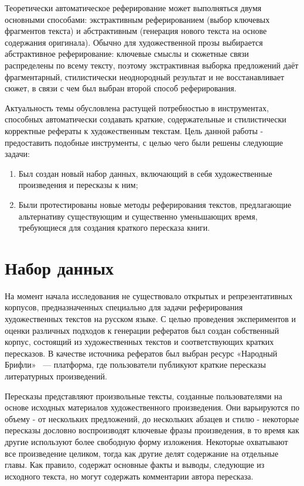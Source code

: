 \documentclass{article}
\begin{document}
Теоретически автоматическое реферирование может выполняться двумя основными способами: экстрактивным реферированием (выбор ключевых фрагментов текста) и абстрактивным (генерация нового текста на основе содержания оригинала). 
Обычно для художественной прозы выбирается абстрактивное реферирование: 
ключевые смыслы и сюжетные связи распределены по всему тексту, поэтому экстрактивная выборка предложений даёт фрагментарный, 
стилистически неоднородный результат и не восстанавливает сюжет, в связи с чем был выбран второй способ реферирования.

Актуальность темы обусловлена растущей потребностью в инструментах, способных
автоматически создавать краткие, содержательные и стилистически корректные рефераты к художественным текстам.
Цель данной работы - предоставить подобные инструменты, с целью чего были решены следующие задачи:
\begin{enumerate}
  \item Был создан новый набор данных, включающий в себя художественные произведения и пересказы к ним;
  \item Были протестированы новые методы реферирования текстов, предлагающие альтернативу существующим и существенно уменьшающих время, требующиеся для создания краткого пересказа книги.
\end{enumerate}


\section*{Набор данных}
На момент начала исследования не существовало открытых и репрезентативных корпусов, предназначенных специально для задачи реферирования художественных текстов на русском языке. 
С целью проведения экспериментов и оценки различных подходов к генерации рефератов был создан собственный корпус, состоящий из художественных текстов и соответствующих кратких пересказов. 
В качестве источника рефератов был выбран ресурс «Народный Брифли»~\cite{Briefly} — платформа, где пользователи публикуют краткие пересказы литературных произведений. 

Пересказы представляют произвольные тексты, созданные пользователями на основе исходных материалов художественного произведения. Они варьируются по объему - от нескольких предложений,
до нескольких абзацев и стилю - некоторые пересказы дословно воспроизводят ключевые фразы произведения, в то время как другие используют более свободную форму изложения. Некоторые
охватывают все произведение целиком, тогда как другие делят содержание на отдельные главы. 
Как правило, содержат основные факты и выводы, следующие из исходного текста, но могут содержать комментарии автора пересказа.
\end{document}
